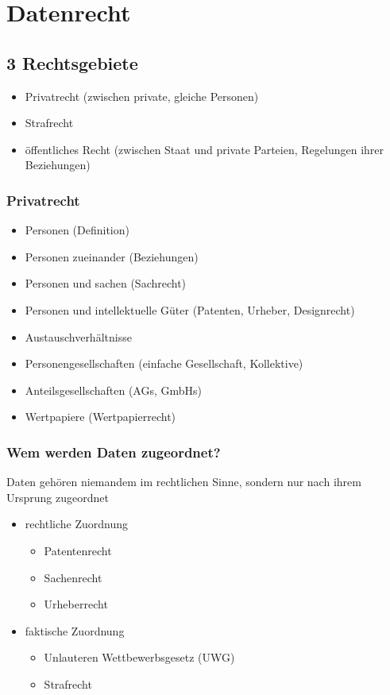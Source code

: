 
\section{Datenrecht}

\subsection{3 Rechtsgebiete}
\begin{itemize}
    \item Privatrecht (zwischen private, gleiche Personen)
    \item Strafrecht 
    \item öffentliches Recht (zwischen Staat und private Parteien, Regelungen ihrer Beziehungen)
\end{itemize}
\subsubsection{Privatrecht}
\begin{itemize}
    \item Personen (Definition)
    \item Personen zueinander (Beziehungen)
    \item Personen und sachen (Sachrecht)
    \item Personen und intellektuelle Güter (Patenten, Urheber, Designrecht)
    \item Austauschverhältnisse 
    \item Personengesellschaften (einfache Gesellschaft, Kollektive)
    \item Anteilsgesellschaften (AGs, GmbHs)
    \item Wertpapiere (Wertpapierrecht)
\end{itemize}

\subsubsection{Wem werden Daten zugeordnet?}
Daten gehören niemandem im rechtlichen Sinne, sondern nur nach ihrem Ursprung zugeordnet
\begin{itemize}
    \item rechtliche Zuordnung
    \begin{itemize}
          \item Patentenrecht
          \item Sachenrecht
          \item Urheberrecht
    \end{itemize}
    \item faktische Zuordnung
    \begin{itemize}
      \item Unlauteren Wettbewerbsgesetz (UWG)
      \item Strafrecht
    \end{itemize}
\end{itemize}

